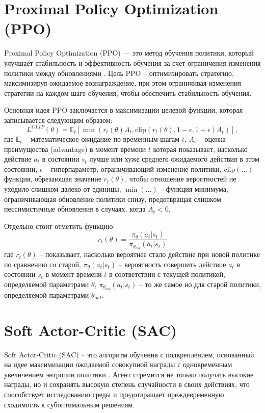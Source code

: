 \section{Proximal Policy Optimization (PPO)}
Proximal Policy Optimization (PPO) — это метод обучения политики, который улучшает стабильность и эффективность 
обучения за счет ограничения изменения политики между обновлениями \cite{lib:rlmethods}. 
Цель PPO -- оптимизировать стратегию, максимизируя ожидаемое вознаграждение, при этом
ограничивая изменения стратегии на каждом шаге обучения, чтобы обеспечить стабильность обучения. 

Основная идея PPO заключается в максимизации целевой функции, которая записывается следующим образом:
\begin{equation}
L^{CLIP}(\theta) = \mathbb{E}_t \left[ \min \left( r_t(\theta) A_t, \text{clip}(r_t(\theta), 1 - \epsilon, 1 + \epsilon) A_t \right) \right],
\end{equation}
где 
$\mathbb{E}_t$ -- математическое ожидание по временным шагам $t$, 
$A_t$ -- оценка преимущества (advantage) в момент времени $t$ которая показывает, насколько действие $a_t$ в состоянии $s_t$ лучше или хуже среднего ожидаемого действия в этом состоянии,
$\epsilon$ -- гиперпараметр, ограничивающий изменение политики,
$\text{clip}(...)$ -- функция, обрезающая значение $r_t(\theta)$, чтобы отношение вероятностей не уходило слишком далеко от единицы,
$\min(...)$ -- функция минимума, ограничивающая обновление политики снизу, предотвращая слишком пессимистичные обновления в случаях, когда $A_t < 0$.

Отдельно стоит отметить функцию:
\begin{equation}
    r_t(\theta) = \frac{\pi_\theta(a_t|s_t)}{\pi_{\theta_{old}}(a_t|s_t)}
    \label{eq:rt}
\end{equation}
где
$r_t(\theta)$ -- показывает, насколько вероятнее стало действие при новой политике по сравнению со старой,
$\pi_\theta(a_t|s_t)$ -- вероятность совершить действие $a_t$ в состоянии $s_t$ в момент времени $t$ в соответствии с текущей политикой, определяемой параметрами $\theta$,
$\pi_{\theta_{old}}(a_t|s_t)$ -- то же самое но для старой политики, определяемой параметрами $\theta_{old}$.

\section{Soft Actor-Critic (SAC)}
Soft Actor-Critic (SAC) -- это алгоритм обучения с подкреплением, основанный на идее максимизации ожидаемой совокупной награды 
с одновременным увеличением энтропии политики \cite{lib:rlmethods}. 
Агент стремится не только получать высокие награды, но и сохранять высокую степень случайности в своих действиях, 
что способствует исследованию среды и предотвращает преждевременную сходимость к субоптимальным решениям.

